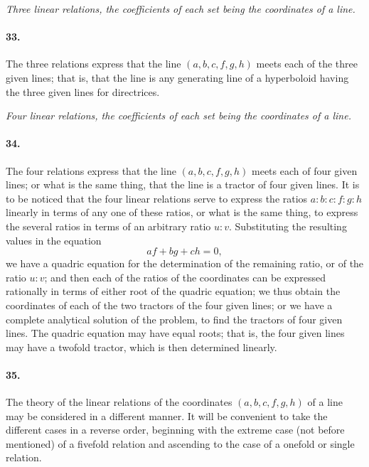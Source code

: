 \documentclass[11pt,a4paper]{article}
\begin{document}
\bigskip
\begin{center}
\textit{Three linear relations, the coefficients of each set being the coordinates of a line.}
\end{center}

\paragraph{33.}
The three relations express that the line $(a,b,c,f,g,h)$ meets each of the
three given lines; that is, that the line is any generating line of a hyperboloid having
the three given lines for directrices.

\bigskip
\begin{center}
\textit{Four linear relations, the coefficients of each set being the coordinates of a line.}
\end{center}

\paragraph{34.}
The four relations express that the line $(a,b,c,f,g,h)$ meets each of four
given lines; or what is the same thing, that the line is a tractor of four given
lines. It is to be noticed that the four linear relations serve to express the ratios
$a:b:c:f:g:h$ linearly in terms of any one of these ratios, or what is the same
thing, to express the several ratios in terms of an arbitrary ratio $u:v$. Substituting
the resulting values in the equation
\[
af + bg + ch = 0,
\]
we have a quadric equation for the determination of the remaining ratio, or of the
ratio $u:v$; and then each of the ratios of the coordinates can be expressed rationally
in terms of either root of the quadric equation; we thus obtain the coordinates of
each of the two tractors of the four given lines; or we have a complete analytical
solution of the problem, to find the tractors of four given lines. The quadric equation
may have equal roots; that is, the four given lines may have a twofold tractor, which is
then determined linearly.

\paragraph{35.}
The theory of the linear relations of the coordinates $(a,b,c,f,g,h)$ of a line
may be considered in a different manner. It will be convenient to take the different
cases in a reverse order, beginning with the extreme case (not before mentioned) of
a fivefold relation and ascending to the case of a onefold or single relation.
\end{document}
